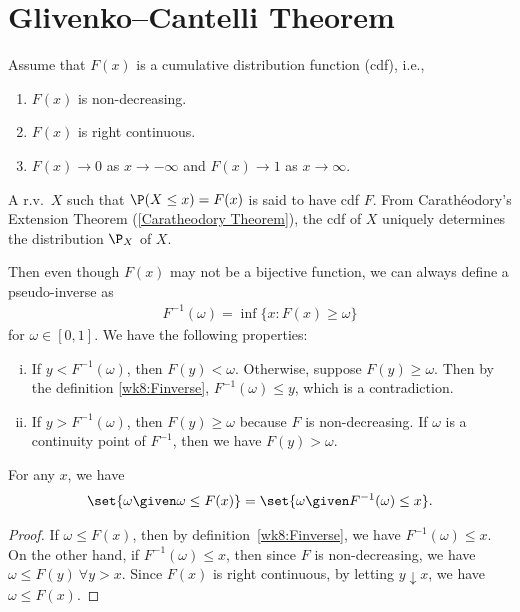 \documentclass[../aipt.tex]{subfiles}
\begin{document}

\section{Glivenko–Cantelli Theorem}

Assume that $F(x)$ is a cumulative distribution function (cdf), i.e., 
\begin{enumerate}[-]
\item $F(x)$ is non-decreasing.
\item $F(x)$ is right continuous.
\item $F(x) \to 0$ as $x \to -\infty$ and $F(x) \to1$ as $x \to \infty$.
\end{enumerate}
A r.v.\ $X$ such that $\P(X\leq x) = F(x)$ is said to have cdf $F$. From Carath{\'e}odory's Extension Theorem (\cref{Caratheodory Theorem}), the cdf of $X$ uniquely determines the distribution $\P_X$ of $X$.

Then even though $F(x)$ may not be a bijective function, we can always define a pseudo-inverse as
\begin{align}\label{wk8:Finverse}
F^{-1}(\omega)= \inf \{x: F(x)\geq \omega\}  
\end{align}
for $\omega \in [0,1]$. We have the following properties:
\begin{enumerate}[(i)]
\item If $y < F^{-1}(\omega)$, then $F(y)< \omega$.
Otherwise, suppose $F(y) \geq \omega$. Then by the definition \cref{wk8:Finverse}, $F^{-1}(\omega)\leq y$, which is a contradiction.
\item If $y > F^{-1}(\omega)$, then $F(y)\geq \omega$ because $F$ is non-decreasing. If $\omega$ is a continuity point of $F^{-1}$, then we have $F(y) > \omega$.
\end{enumerate}

\begin{Lemma} \label{wk8:lemma:set}
For any $x$, we have
\begin{align*}
\set{\omega\given \omega \leq F(x)}=\set{\omega\given F^{-1}(\omega)\leq x}.
\end{align*}
\end{Lemma}
\begin{proof}
If $\omega \leq F(x)$, then by definition~\cref{wk8:Finverse}, we have $F^{-1}(\omega)\leq x$. On the other hand, if $F^{-1}(\omega) \leq x$, then since $F$ is non-decreasing, we have $\omega \leq F(y) \ \forall y > x$. Since $F(x)$ is right continuous, by letting $y \downarrow x$, we have $\omega \leq F(x)$.
\end{proof}
\end{document}
